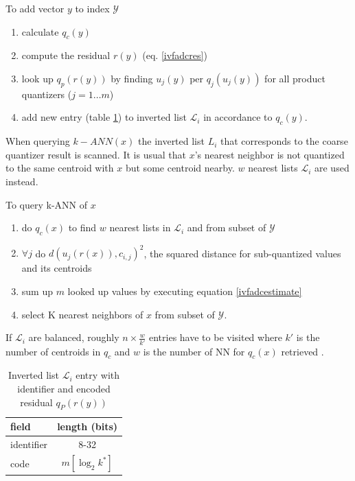 \documentclass[english,12pt,a4paper,pdftex,elec,utf8, table]{aaltothesis}
\begin{document}
To add vector $y$ to index $\mathcal{Y}$
\begin{enumerate}
\item calculate $q_c(y)$
\item compute the residual $r(y)$ (eq. \ref{ivfadcres})
\item look up $q_p(r(y))$ by finding $u_j(y)$ per $q_j(u_j(y))$ for all product quantizers ($j = 1 \ldots m$)
\item add new entry (table \ref{ivfadcentry}) to inverted list $\mathcal{L}_i$ in accordance to $q_c(y)$.
\end{enumerate}

When querying $k-ANN(x)$ the inverted list $L_i$ that corresponds to the coarse quantizer result is scanned. It is usual that $x$'s nearest neighbor is not quantized to the same centroid with $x$ but some centroid nearby. $w$ nearest lists $\mathcal{L}_i$ are used instead. \cite{Jegou2008}

To query k-ANN of $x$
\begin{enumerate}
\item do $q_c(x)$ to find $w$ nearest lists in $\mathcal{L}_i$ and from subset of $\mathcal{Y}$
\item $\forall j$ do $d(u_j(r(x)), c_{i,j})^2$, the squared distance for sub-quantized values and its centroids
\item sum up $m$ looked up values by executing equation \ref{ivfadcestimate}
  \item select K nearest neighbors of $x$ from subset of $\mathcal{Y}$.
\end{enumerate}
\cite{Jegou2008}

If $\mathcal{L}_i$ are balanced, roughly $n \times \frac{w}{k'}$ entries have to be visited where $k'$ is the number of centroids in $q_c$ and $w$ is the number of NN for $q_c(x)$ retrieved \cite{Jegou2008}.

\def\arraystretch{1.5}
\begin{table}[htb]
\caption{Inverted list $\mathcal{L}_i$ entry with identifier and encoded residual $q_P(r(y))$ \cite{Jegou2008}}
\label{ivfadcentry}
\begin{center}
\begin{tabular}{lc}
  field & length (bits)\\
  \hline
  identifier&8-32\\
  code & $m[\log_2k^*]$\\
\end{tabular}
\end{center}\end{table}
\end{document}
